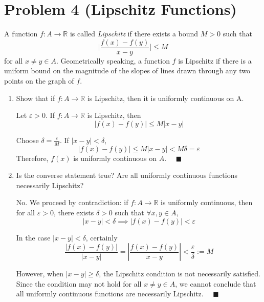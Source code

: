 \documentclass[12pt]{article}
\newcommand{\R}{\mathbb{R}}
\newcommand{\qed}{\quad \blacksquare}
\newcommand{\abs}[1]{\left\vert #1 \right\vert}
\newcommand{\ep}{\varepsilon}
\begin{document}
\pagebreak 

\section*{Problem 4 (Lipschitz Functions)}
A function $f:A\to\mathbb{R}$ is called \textit{Lipschitz} if there exists a bound $M>0$ such that
\begin{equation*}
	\bigg|\frac{f(x)-f(y)}{x-y} \bigg|\leq M
\end{equation*}
for all $x\neq y\in A$. Geometrically speaking, a function $f$ is Lipschitz if there is a uniform bound on the magnitude of the slopes of lines drawn through any two points on the graph of $f$.
\begin{enumerate}
	\item Show that if $f:A\to\mathbb{R}$ is Lipschitz, then it is uniformly continuous on A.
    
        \color{blue}
            Let $\ep > 0$. If $f: A \to \R$ is Lipschitz, then 
            \[\abs{f(x) - f(y)} \leq M \abs{x - y}\]

            Choose $\delta = \frac{\ep}{M}$. If $\abs{x - y} < \delta$, 
            \[\abs{f(x) - f(y)} \leq M\abs{x - y} < M\delta = \ep\]
            Therefore, $f(x)$ is uniformly continuous on $A$. $\qed$
        \color{black}

	\item Is the converse statement true? Are all uniformly continuous functions necessarily Lipschitz?
	
        \color{blue}
            No. We proceed by contradiction: if $f: A \to \R$ is uniformly continuous, then for all $\ep > 0$, there exists $\delta > 0$ such that $\forall x, y \in A$,
            \[\abs{x - y} < \delta \implies \abs{f(x) - f(y)} < \ep\] 

            In the case $\abs{x - y} < \delta$, certainly 
            \[\frac{\abs{f(x) - f(y)}}{\abs{x - y}} = \abs{\frac{f(x) - f(y)}{x - y}} < \frac{\ep}{\delta} := M\]

            However, when $\abs{x - y} \geq \delta$, the Lipschitz condition is not necessarily satisfied. Since the condition may not hold for all $x \neq y \in A$, we cannot conclude that all uniformly continuous functions are necessarily Lipschitz. $\qed$
        \color{black}

\end{enumerate}

\pagebreak
\end{document}
